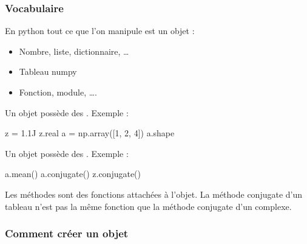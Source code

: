 \documentclass[letterpaper,10pt,english]{sphinxhowto}
\begin{document}
\subsubsection{Vocabulaire}
\label{\detokenize{cours6_objet_cours:vocabulaire}}
\sphinxAtStartPar
En python tout ce que l’on manipule est un objet :
\begin{itemize}
\item {} 
\sphinxAtStartPar
Nombre, liste, dictionnaire, …

\item {} 
\sphinxAtStartPar
Tableau numpy

\item {} 
\sphinxAtStartPar
Fonction, module, ….

\end{itemize}

\sphinxAtStartPar
Un objet possède des . Exemple :

\begin{sphinxVerbatim}[commandchars=\\\{\}]
z = 1.1J
z.real
a = np.array([1, 2, 4])
a.shape
\end{sphinxVerbatim}

\sphinxAtStartPar
Un objet possède des . Exemple :

\begin{sphinxVerbatim}[commandchars=\\\{\}]
a.mean()
a.conjugate()
z.conjugate()
\end{sphinxVerbatim}

\sphinxAtStartPar
Les méthodes sont des fonctions attachées à l’objet. La méthode conjugate d’un tableau n’est pas la même fonction que la méthode conjugate d’un complexe.


\subsubsection{Comment créer un objet}
\label{\detokenize{cours6_objet_cours:comment-creer-un-objet}}
\end{document}
